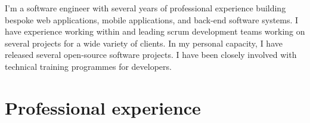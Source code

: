 \documentclass[11pt,a4paper,sans]{moderncv}
\begin{document}
\makecvtitle

\vspace{-20pt}

I'm a software engineer with several years of professional experience building bespoke web applications, mobile applications, and back-end software systems. I have experience working within and leading scrum development teams working on several projects for a wide variety of clients. In my personal capacity, I have released several open-source software projects. I have been closely involved with technical training programmes for developers.\\

\vspace{-12pt}

\section{Professional experience}

\vspace{3pt}
\end{document}
